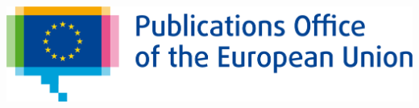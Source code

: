 \begin{titlepage}
	\begin{center}

		\begin{center}
			\begin{center}
				\setlength{\tabcolsep}{0pt}
				\includegraphics[width=0.35\linewidth]{../../images/logos/EU-OP.png}
			\end{center}
			
			
			\vspace{2mm}
			
		\end{center}
		\vspace{5cm}
		\textbf{{\large \DelInitiative\\}}
		\vspace{2cm}
		
		\begin{spacing}{2.5}
			\textbf{\Huge \DelTitle}\\ \vspace{2cm}
		\end{spacing}
		
		
		
		\vspace*{\fill}
		
		
		
	\end{center}
\end{titlepage}

\clearpage


\setlength{\headheight}{1cm}
\setlength{\footskip}{18mm}
\addtolength{\textheight}{-\footskip}
\pagestyle{empty}

